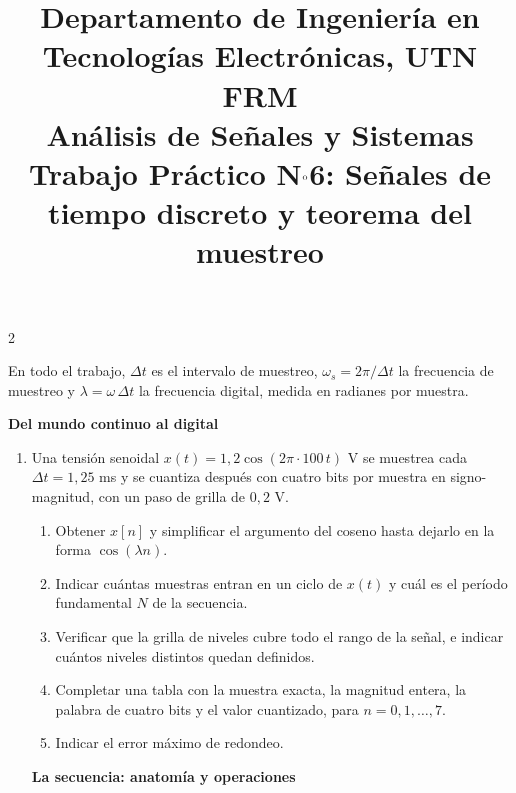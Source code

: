\documentclass[10pt,a4paper]{article}
\title{%
	{\normalsize Departamento de Ingeniería en Tecnologías Electrónicas, UTN FRM}\\[0.1cm]
	{\large Análisis de Señales y Sistemas}\\[0.15cm]
	{\normalsize Trabajo Práctico N$^{\text o}$6: Señales de tiempo discreto y teorema del muestreo}%
}
\author{}
\date{}
\begin{document}
	\maketitle
	\thispagestyle{fancy}

	\begin{multicols}{2}

		\label{sec:enun}

		{\small\noindent En todo el trabajo, $\Delta t$ es el intervalo de
		muestreo, $\omega_s = 2\pi/\Delta t$ la frecuencia de muestreo y
		$\lambda = \omega\,\Delta t$ la frecuencia digital, medida en radianes
		por muestra.}

		\vspace{0.4em}

		\textbf{Del mundo continuo al digital}
		\begin{enumerate}

		\item Una tensión senoidal $x(t) = 1{,}2\cos(2\pi\cdot 100\,t)$ V se
		muestrea cada $\Delta t = 1{,}25$ ms y se cuantiza después con cuatro
		bits por muestra en signo-magnitud, con un paso de grilla de $0{,}2$ V.
		\begin{enumerate}
			\item Obtener $x[n]$ y simplificar el argumento del coseno hasta
			dejarlo en la forma $\cos(\lambda n)$.
			\item Indicar cuántas muestras entran en un ciclo de $x(t)$ y cuál
			es el período fundamental $N$ de la secuencia.
			\item Verificar que la grilla de niveles cubre todo el rango de la
			señal, e indicar cuántos niveles distintos quedan definidos.
			\item Completar una tabla con la muestra exacta, la magnitud
			entera, la palabra de cuatro bits y el valor cuantizado, para
			$n = 0, 1, \dots, 7$.
			\item Indicar el error máximo de redondeo.

		\end{enumerate}

		\textbf{La secuencia: anatomía y operaciones}


\end{enumerate}
\end{multicols}
\end{document}
